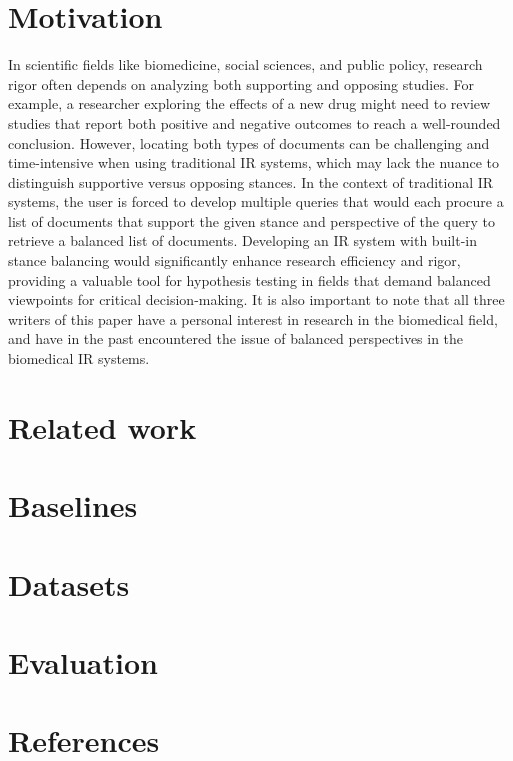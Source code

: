 \documentclass[sigconf]{acmart}
\begin{document}
\section{Motivation}
In scientific fields like biomedicine, social sciences, and public policy, research rigor often depends on analyzing both supporting and opposing studies. For example, a researcher exploring the effects of a new drug might need to review studies that report both positive and negative outcomes to reach a well-rounded conclusion. However, locating both types of documents can be challenging and time-intensive when using traditional IR systems, which may lack the nuance to distinguish supportive versus opposing stances. In the context of traditional IR systems, the user is forced to develop multiple queries that would each procure a list of documents that support the given stance and perspective of the query to retrieve a balanced list of documents. Developing an IR system with built-in stance balancing would significantly enhance research efficiency and rigor, providing a valuable tool for hypothesis testing in fields that demand balanced viewpoints for critical decision-making. It is also important to note that all three writers of this paper have a personal interest in research in the biomedical field, and have in the past encountered the issue of balanced perspectives in the biomedical IR systems.

\section{Related work}

\section{Baselines}

\section{Datasets}

\section{Evaluation}

\section{References}
\end{document}
